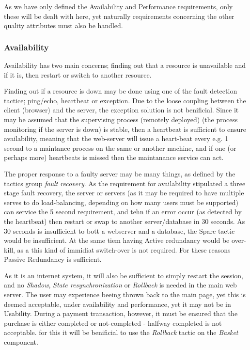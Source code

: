 As we have only defined the Availability and Performance requirements, only these will be dealt with here, yet naturally requirements concerning the other quality attributes must also be handled.

\subsubsection{Availability}
Availability has two main concerns; finding out that a resource is unavailable and if it is, then restart or switch to another resource. 

Finding out if a resource is down may be done using one of the fault detection tactice; ping/echo, heartbeat or exception. Due to the loose coupling between the client (browser) and the server, the exception solution is not benificial. Since it may be assumed that the supervising process (remotely deployed) (the process monitoring if the server is down) is stable, then a heartbeat is sufficient to ensure availability, meaning that the web-server will issue a heart-beat every e.g. 1 second to a maintance process on the same or another machine, and if one (or perhaps more) heartbeats is missed then the maintanance service can act.

The proper response to a faulty server may be many things, as defined by the tactics group \emph{fault recovery}. As the requirement for availability stipulated a three stage fault recovery, the server or servers (as it may be required to have multiple serves to do load-balancing, depending on how many users must be supported) can service the 5 second requirement, and tehn if an error occur (as detected by the heartbeat) then restart or swap to another server/database in 30 seconds. As 30 seconds is insufficient to bott a webserver and a database, the Spare tactic would be insufficient. At the same tiem having Active redundancy would be over-kill, as a this kind of immidiat switch-over is not required. For these reasons Passive Redundancy is sufficient.

As it is an internet system, it will also be sufficient to simply restart the session, and no \emph{Shadow}, \emph{State resynchronization} or \emph{Rollback} is needed in the main web server. The user may experience beeing thrown back to the main page, yet this is deemed acceptable, under availability and performance, yet it may not be in Usability. During a payment transaction, however, it must be ensured that the purchase is either completed or not-completed - halfway completed is not acceptable. for this it will be benificial to use the \emph{Rollback} tactic on the \emph{Basket} component.

